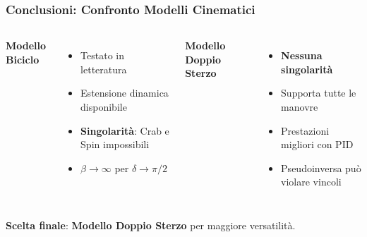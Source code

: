 \begin{frame}
    \frametitle{Conclusioni: Confronto Modelli Cinematici}
    \begin{columns}
        \textbf{Modello Biciclo}
        \begin{itemize}
            \item[+] Testato in letteratura
            \item[+] Estensione dinamica disponibile
            \item[-] \textbf{Singolarità}: Crab e Spin impossibili
            \item[-] $\beta \to \infty$ per $\delta \to \pi/2$
        \end{itemize}

        \textbf{Modello Doppio Sterzo}
        \begin{itemize}
            \item[+] \textbf{Nessuna singolarità}
            \item[+] Supporta tutte le manovre
            \item[+] Prestazioni migliori con PID
            \item[!] Pseudoinversa può violare vincoli
        \end{itemize}
    \end{columns}

    \vspace{0.5cm}

    \textbf{Scelta finale}: \textcolor{green!60!black}{\textbf{Modello Doppio Sterzo}} per maggiore versatilità.
\end{frame}
